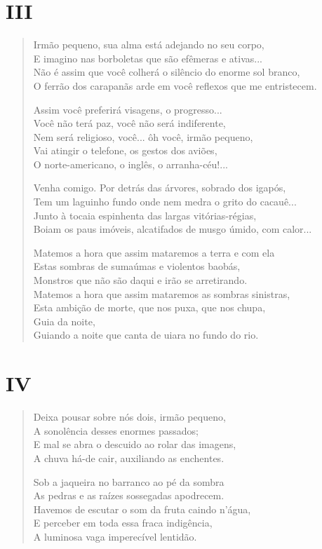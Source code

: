 \medskip
\section{III}

\begin{verse}
Irmão pequeno, sua alma está adejando no seu corpo,\\
E imagino nas borboletas que são efêmeras e ativas...\\
Não é assim que você colherá o silêncio do enorme sol branco,\\
O ferrão dos carapanãs arde em você reflexos que me entristecem.

Assim você preferirá visagens, o progresso...\\
Você não terá paz, você não será indiferente,\\
Nem será religioso, você... ôh você, irmão pequeno,\\
Vai atingir o telefone, os gestos dos aviões,\\
O norte-americano, o inglês, o arranha-céu!...

Venha comigo. Por detrás das árvores, sobrado dos igapós,\\
Tem um laguinho fundo onde nem medra o grito do cacauê...\\
Junto à tocaia espinhenta das largas vitórias-régias,\\
Boiam os paus imóveis, alcatifados de musgo úmido, com calor...

Matemos a hora que assim mataremos a terra e com ela\\
Estas sombras de sumaúmas e violentos baobás,\\
Monstros que não são daqui e irão se arretirando.\\
Matemos a hora que assim mataremos as sombras sinistras,\\
Esta ambição de morte, que nos puxa, que nos chupa,\\
Guia da noite,\\
Guiando a noite que canta de uiara no fundo do rio.
\end{verse}

\medskip
\section{IV}

\begin{verse}
Deixa pousar sobre nós dois, irmão pequeno,\\
A sonolência desses enormes passados;\\
E mal se abra o descuido ao rolar das imagens,\\
A chuva há-de cair, auxiliando as enchentes.

Sob a jaqueira no barranco ao pé da sombra\\
As pedras e as raízes sossegadas apodrecem.\\
Havemos de escutar o som da fruta caindo n'água,\\
E perceber em toda essa fraca indigência,\\
A luminosa vaga imperecível lentidão.
\end{verse}

